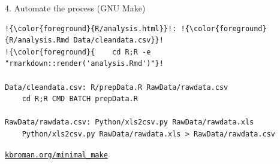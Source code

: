 \documentclass[12pt,t]{beamer}
\begin{document}
\begin{frame}[fragile,c]{4. Automate the process (GNU Make)}

\vspace{15mm}

\begin{center}
\begin{minipage}[c]{10.8cm}
\begin{semiverbatim}
\begin{lstlisting}[escapechar=!,linewidth=10.8cm]
!{\color{foreground}{R/analysis.html}}!: !{\color{foreground}{R/analysis.Rmd Data/cleandata.csv}}!
!{\color{foreground}{    cd R;R -e "rmarkdown::render('analysis.Rmd')"}!

Data/cleandata.csv: R/prepData.R RawData/rawdata.csv
    cd R;R CMD BATCH prepData.R

RawData/rawdata.csv: Python/xls2csv.py RawData/rawdata.xls
    Python/xls2csv.py RawData/rawdata.xls > RawData/rawdata.csv
\end{lstlisting}
\end{semiverbatim}
\end{minipage}
\end{center}

\vspace{15mm}

\hfill
{\footnotesize \lolit
\href{http://kbroman.org/minimal_make}{\tt kbroman.org/minimal\_make}
}


\end{frame}
\end{document}
